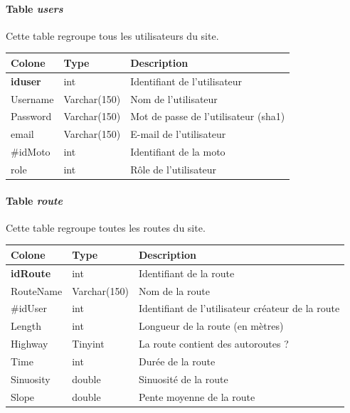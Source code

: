 \documentclass[a4paper]{article}
\begin{document}
\paragraph{Table \emph{users}}
Cette table regroupe tous les utilisateurs du site.

\begin{tabular}{|l|l|l|}
	\hline
	Colone          & Type         & Description                          \\ \hline\hline
	\textbf{iduser} & int          & Identifiant de l'utilisateur         \\ \hline
	Username        & Varchar(150) & Nom de l'utilisateur                 \\ \hline
	Password        & Varchar(150) & Mot de passe de l'utilisateur (sha1) \\ \hline
	email           & Varchar(150) & E-mail de l'utilisateur              \\ \hline
	\#idMoto        & int          & Identifiant de la moto               \\ \hline
	role            & int          & Rôle de l'utilisateur                \\ \hline
\end{tabular}

\paragraph{Table \emph{route}}
Cette table regroupe toutes les routes du site.

\begin{tabular}{|l|l|l|}
	\hline
	Colone           & Type         & Description                                       \\ \hline\hline
	\textbf{idRoute} & int          & Identifiant de la route                           \\ \hline
	RouteName        & Varchar(150) & Nom de la route                                   \\ \hline
	\#idUser         & int          & Identifiant de l'utilisateur créateur de la route \\ \hline
	Length           & int          & Longueur de la route (en mètres)                  \\ \hline
	Highway          & Tinyint      & La route contient des autoroutes ?                \\ \hline
	Time             & int          & Durée de la route                                 \\ \hline
	Sinuosity        & double       & Sinuosité de la route                            \\ \hline
	Slope            & double       & Pente moyenne de la route                         \\ \hline
\end{tabular}
\end{document}
